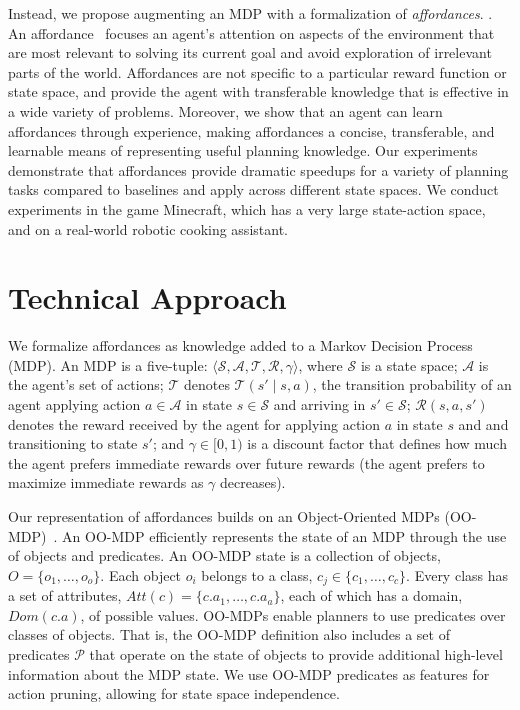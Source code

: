\documentclass[letterpaper]{article}
\newcommand{\dnote}[1]{\textcolor{Green}{\textbf{}}}
\begin{document}
Instead, we propose augmenting an MDP with a formalization of {\em
  affordances}. \dnote{Should add a line here contextualizing affordance literature
  (maybe Chemero or Gibson quote)}. An affordance~\cite{gibson77} focuses an agent's
attention on aspects of the environment that are most relevant to
solving its current goal and avoid exploration of irrelevant parts of
the world. Affordances are not specific to a particular reward
function or state space, and provide the agent with transferable
knowledge that is effective in a wide variety of problems. Moreover,
we show that an agent can learn affordances through experience, making
affordances a concise, transferable, and learnable means of
representing useful planning knowledge.  Our experiments demonstrate
that affordances provide dramatic speedups for a variety of planning
tasks compared to baselines and apply across different state spaces.
We conduct experiments in the game Minecraft, which has a very large
state-action space, and on a real-world robotic cooking assistant.


\section{Technical Approach}
\label{sec:affordances}

We formalize affordances as knowledge added to a Markov Decision Process
(MDP).  An MDP is a five-tuple: $\langle \mathcal{S}, \mathcal{A},
\mathcal{T}, \mathcal{R}, \gamma \rangle$, where $\mathcal{S}$ is a
state space; $\mathcal{A}$ is the agent's set of actions;
$\mathcal{T}$ denotes $\mathcal{T}(s' \mid s,a)$, the transition
probability of an agent applying action $a \in \mathcal{A}$ in state
$s \in \mathcal{S}$ and arriving in $s' \in \mathcal{S}$;
$\mathcal{R}(s,a,s')$ denotes the reward received by the agent for
applying action $a$ in state $s$ and and transitioning to state $s'$;
and $\gamma \in [0, 1)$ is a discount factor that defines how much the
agent prefers immediate rewards over future rewards (the agent
prefers to maximize immediate rewards as $\gamma$ decreases).

Our representation of affordances builds on an
Object-Oriented MDPs (OO-MDP)~\citep{diuk08}.  An OO-MDP efficiently
represents the state of an MDP through the use of objects and
predicates.  An OO-MDP state is a collection of objects, $O = \{o_1,
\ldots, o_o \}$.  Each object $o_i$ belongs to a class, $c_j \in
\{c_1, \ldots, c_c\}$. Every class has a set of attributes, $Att(c) =
\{c.a_1, \ldots, c.a_a \}$, each of which has a domain, $Dom(c.a)$, of
possible values. OO-MDPs enable planners to use predicates over
classes of objects. That is, the OO-MDP definition also includes a set
of predicates $\mathcal{P}$ that operate on the state of objects to
provide additional high-level information about the MDP state. We use
OO-MDP predicates as features for action pruning, allowing for state
space independence.
\end{document}
